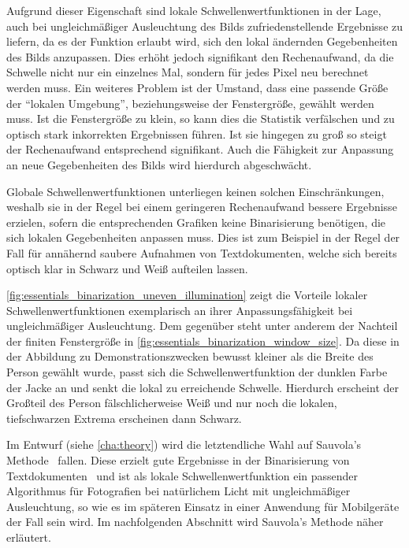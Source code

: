 Aufgrund dieser Eigenschaft sind lokale Schwellenwertfunktionen in der Lage, auch bei ungleichmäßiger Ausleuchtung des Bilds zufriedenstellende Ergebnisse zu liefern, da es der Funktion erlaubt wird, sich den lokal ändernden Gegebenheiten des Bilds anzupassen.
Dies erhöht jedoch signifikant den Rechenaufwand, da die Schwelle nicht nur ein einzelnes Mal, sondern für jedes Pixel neu berechnet werden muss.
Ein weiteres Problem ist der Umstand, dass eine passende Größe der \enquote{lokalen Umgebung}, beziehungsweise der Fenstergröße, gewählt werden muss.
Ist die Fenstergröße zu klein, so kann dies die Statistik verfälschen und zu optisch stark inkorrekten Ergebnissen führen.
Ist sie hingegen zu groß so steigt der Rechenaufwand entsprechend signifikant.
Auch die Fähigkeit zur Anpassung an neue Gegebenheiten des Bilds wird hierdurch abgeschwächt.

Globale Schwellenwertfunktionen unterliegen keinen solchen Einschränkungen, weshalb sie in der Regel bei einem geringeren Rechenaufwand bessere Ergebnisse erzielen, sofern die entsprechenden Grafiken keine Binarisierung benötigen, die sich lokalen Gegebenheiten anpassen muss.
Dies ist zum Beispiel in der Regel der Fall für annähernd saubere Aufnahmen von Textdokumenten, welche sich bereits optisch klar in Schwarz und Weiß aufteilen lassen.

\autoref{fig:essentials_binarization_uneven_illumination} zeigt die Vorteile lokaler Schwellenwertfunktionen exemplarisch an ihrer Anpassungsfähigkeit bei ungleichmäßiger Ausleuchtung.
Dem gegenüber steht unter anderem der Nachteil der finiten Fenstergröße in \autoref{fig:essentials_binarization_window_size}.
Da diese in der Abbildung zu Demonstrationszwecken bewusst kleiner als die Breite des Person gewählt wurde, passt sich die Schwellenwertfunktion der dunklen Farbe der Jacke an und senkt die lokal zu erreichende Schwelle.
Hierdurch erscheint der Großteil des Person fälschlicherweise Weiß und nur noch die lokalen, tiefschwarzen Extrema erscheinen dann Schwarz.

Im Entwurf (siehe \autoref{cha:theory}) wird die letztendliche Wahl auf Sauvola's Methode~\cite{DBLP:journals/pr/SauvolaP00} fallen.
Diese erzielt gute Ergebnisse in der Binarisierung von Textdokumenten~\cite{DBLP:journals/jei/SezginS04} und ist als lokale Schwellenwertfunktion ein passender Algorithmus für Fotografien bei natürlichem Licht mit ungleichmäßiger Ausleuchtung, so wie es im späteren Einsatz in einer Anwendung für Mobilgeräte der Fall sein wird.
Im nachfolgenden Abschnitt wird Sauvola's Methode näher erläutert.

